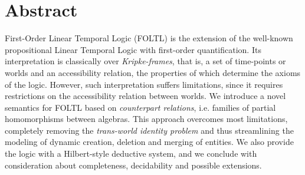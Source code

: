 \begingroup
\let\clearpage\relax
\let\cleardoublepage\relax
\let\cleardoublepage\relax

\chapter*{Abstract}
First-Order Linear Temporal Logic (FOLTL) is the extension of the well-known propositional Linear Temporal Logic with
first-order quantification. Its interpretation is classically over \emph{Kripke-frames}, that is, a set of time-points
or worlds and an accessibility relation, the properties of which determine the axioms of the logic.  However, such
interpretation suffers limitations, since it requires restrictions on the accessibility relation between worlds. We
introduce a novel semantics for FOLTL based on \emph{counterpart relations}, i.e. families of partial homomorphisms
between algebras. This approach overcomes most limitations, completely removing the \emph{trans-world identity problem}
and thus streamlining the modeling of dynamic creation, deletion and merging of entities. We also provide the logic with
a Hilbert-style deductive system, and we conclude with consideration about completeness, decidability and possible
extensions.

\endgroup
\vfill
